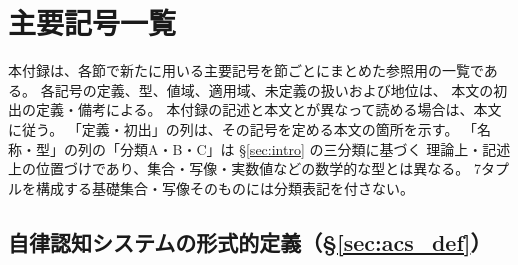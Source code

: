 \section{主要記号一覧}
\label{app:symbols}

本付録は、各節で新たに用いる主要記号を節ごとにまとめた参照用の一覧である。
各記号の定義、型、値域、適用域、未定義の扱いおよび地位は、
本文の初出の定義・備考による。
本付録の記述と本文とが異なって読める場合は、本文に従う。
「定義・初出」の列は、その記号を定める本文の箇所を示す。
「名称・型」の列の「分類A・B・C」は \S\ref{sec:intro} の三分類に基づく
理論上・記述上の位置づけであり、集合・写像・実数値などの数学的な型とは異なる。
7タプルを構成する基礎集合・写像そのものには分類表記を付さない。

\subsection{自律認知システムの形式的定義（\S\ref{sec:acs_def}）}
\label{app:symbols_s2}

